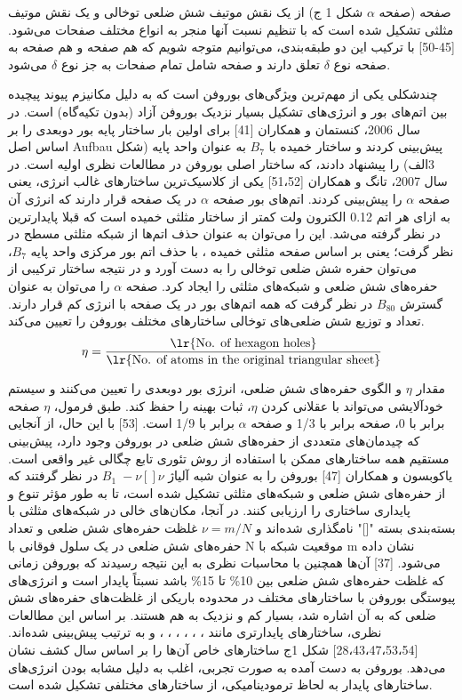 صفحه  (صفحه $\alpha$ شکل 1 ج) از یک نقش موتیف شش ضلعی توخالی  و یک نقش موتیف مثلثی  تشکیل شده است که با تنظیم نسبت آنها منجر به انواع مختلف صفحات  می‌شود. [45-50] با ترکیب این دو طبقه‌بندی، می‌توانیم متوجه شویم که هم صفحه  و هم صفحه  به صفحه نوع $\delta$ تعلق دارند و صفحه  شامل تمام صفحات به جز نوع $\delta$ می‌شود.

چندشکلی یکی از مهم‌ترین ویژگی‌های بوروفن است که به دلیل مکانیزم پیوند پیچیده بین اتم‌های بور و انرژی‌های تشکیل بسیار نزدیک بوروفن آزاد (بدون تکیه‌گاه) است. در سال 2006، کنستمان و همکاران [41] برای اولین بار ساختار پایه بور دوبعدی را بر اساس اصل Aufbau پیش‌بینی کردند و ساختار خمیده با $B_7$ به عنوان واحد پایه (شکل 3الف) را پیشنهاد دادند، که ساختار اصلی بوروفن در مطالعات نظری اولیه است. در سال 2007، تانگ و همکاران [51،52] یکی از کلاسیک‌ترین ساختارهای غالب انرژی، یعنی صفحه $\alpha$ را پیش‌بینی کردند. اتم‌های بور صفحه $\alpha$ در یک صفحه قرار دارند که انرژی آن به ازای هر اتم 0.12 الکترون ولت کمتر از ساختار مثلثی خمیده است که قبلا پایدارترین در نظر گرفته می‌شد. این را می‌توان به عنوان حذف اتم‌ها از شبکه مثلثی مسطح در نظر گرفت؛ یعنی بر اساس صفحه مثلثی خمیده ، با حذف اتم بور مرکزی واحد پایه $B_{7}$، می‌توان حفره شش ضلعی توخالی را به دست آورد و در نتیجه ساختار ترکیبی از حفره‌های شش ضلعی و شبکه‌های مثلثی را ایجاد کرد. صفحه $\alpha$ را می‌توان به عنوان گسترش $B_{80}$ در نظر گرفت که همه اتم‌های بور در یک صفحه با انرژی کم قرار دارند. تعداد و توزیع شش ضلعی‌های توخالی  ساختارهای مختلف بوروفن را تعیین می‌کند.
\begin{equation}
    \eta=\frac{\text{\lr{No. of hexagon holes}}}{\text{\lr{No. of atoms in the original triangular sheet}}}
\end{equation}

مقدار $\eta$ و الگوی حفره‌های شش ضلعی، انرژی بور دوبعدی را تعیین می‌کنند و سیستم خودآلایشی می‌تواند با عقلانی کردن $\eta$، ثبات بهینه را حفظ کند. طبق فرمول، $\eta$ صفحه  برابر با 0، صفحه  برابر با 1/3 و صفحه $\alpha$ برابر با 1/9 است. [53] با این حال، از آنجایی که چیدمان‌های متعددی از حفره‌های شش ضلعی در بوروفن وجود دارد، پیش‌بینی مستقیم همه ساختارهای ممکن با استفاده از روش تئوری تابع چگالی  غیر واقعی است. یاکوبسون و همکاران [47] بوروفن را به عنوان شبه آلیاژ $B_1\;-\nu[]\nu$ در نظر گرفتند که از حفره‌های شش ضلعی و شبکه‌های مثلثی تشکیل شده است، تا به طور مؤثر تنوع و پایداری ساختاری را ارزیابی کنند. در آنجا، مکان‌های خالی در شبکه‌های مثلثی با بسته‌بندی بسته "[]" نامگذاری شده‌اند و $\nu = m/N$ غلظت حفره‌های شش ضلعی و تعداد حفره‌های شش ضلعی در یک سلول فوقانی با N موقعیت شبکه با m نشان داده می‌شود. [37] آن‌ها همچنین با محاسبات نظری به این نتیجه رسیدند که بوروفن زمانی که غلظت حفره‌های شش ضلعی بین 10\% تا 15\% باشد نسبتاً پایدار است و انرژی‌های پیوستگی بوروفن با ساختارهای مختلف در محدوده باریکی از غلظت‌های حفره‌های شش ضلعی که به آن اشاره شد، بسیار کم و نزدیک به هم هستند. بر اساس این مطالعات نظری، ساختارهای پایدارتری مانند ، ، ، ، ، ،  و  به ترتیب پیش‌بینی شده‌اند. [28،43،47،53،54] شکل 1ج ساختارهای خاص آن‌ها را بر اساس سال کشف نشان می‌دهد. بوروفن به دست آمده به صورت تجربی، اغلب به دلیل مشابه بودن انرژی‌های ساختارهای پایدار به لحاظ ترمودینامیکی، از ساختارهای مختلفی تشکیل شده است.
